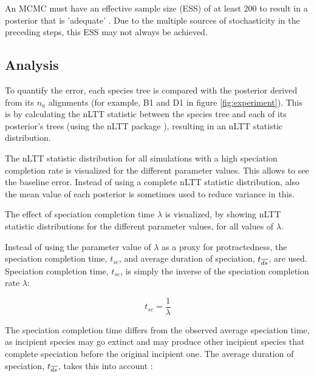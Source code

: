 An MCMC must have an effective sample size (ESS) of at least 200 to result in a 
posterior that is 'adequate' \cite{drummond2015bayesian}. Due to the multiple 
sources of stochasticity in the preceding steps, this ESS may not always be achieved.

\subsection{Analysis}

To quantify the error, each species tree is compared with the posterior derived
from its $n_a$ alignments (for example, B1 and D1 in figure \ref{fig:experiment}).
This is by calculating the nLTT statistic \cite{janzen2015approximate}
between the species tree and each of its posterior's trees (using 
the nLTT package \cite{nLTT}), resulting in an nLTT statistic distribution. 


The nLTT statistic distribution for all simulations with a high speciation 
completion rate is visualized for the different parameter values. This allows
to see the baseline error. Instead of using a complete
nLTT statistic distribution, also the mean value of each posterior is 
sometimes used to reduce variance in this.

The effect of speciation completion time $\lambda$ is visualized, by showing
nLTT statistic distributions for the different parameter values, for all values
of $\lambda$. 

Instead of using the parameter value of $\lambda$ as a proxy for protractedness,
the speciation completion time, $t_{sc}$, and average duration of speciation, $t_{\overline{ds}}$, 
are used. Speciation completion time, $t_{sc}$, is simply the inverse of the
speciation completion rate $\lambda$:

\begin{equation}
  t_{sc} = \frac{1}{\lambda}
  \label{eq:speciation_completion_time}
\end{equation}

The speciation completion time differs from the observed average speciation time, 
as incipient species may go extinct and may produce other incipient species 
that complete speciation before the original incipient one. The average duration 
of speciation, $t_{\overline{ds}}$, takes this into 
account :

